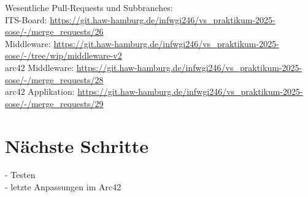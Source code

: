\documentclass{article}
\begin{document}
Wesentliche Pull-Requests und Subbranches:\\
ITS-Board: \url{https://git.haw-hamburg.de/infwgi246/vs_praktikum-2025-sose/-/merge_requests/26}\\
Middleware: \url{https://git.haw-hamburg.de/infwgi246/vs_praktikum-2025-sose/-/tree/wip/middleware-v2}\\
arc42 Middleware: \url{https://git.haw-hamburg.de/infwgi246/vs_praktikum-2025-sose/-/merge_requests/28}\\
arc42 Applikation: \url{https://git.haw-hamburg.de/infwgi246/vs_praktikum-2025-sose/-/merge_requests/29}\\
 
\section{Nächste Schritte}
- Testen \\ 
- letzte Anpassungen im Arc42
\end{document}
